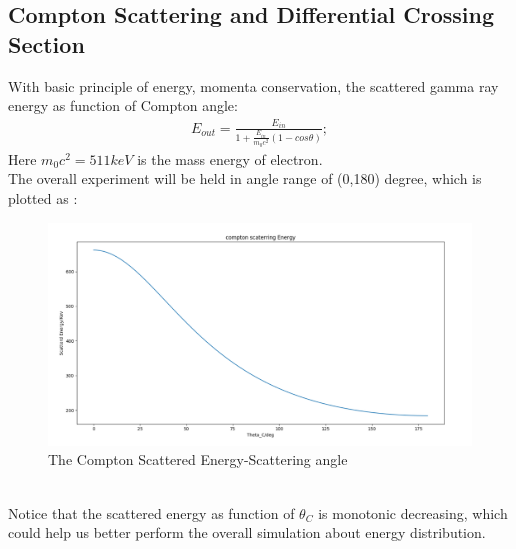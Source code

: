 \documentclass[12pt]{article}
\begin{document}
	\subsection{Compton Scattering and Differential Crossing Section}
	With basic principle of energy, momenta conservation, the scattered gamma ray energy as function of Compton angle:
	\begin{gather}
		E_{out}=\frac{E_{in}}{1+\frac{E_{in}}{{m_0c^2}}(1-cos\theta)};
	\end{gather} 
	Here $m_0c^2=511keV$ is the mass energy of electron.\\
	The overall experiment will be held in angle range of (0,180) degree, which is plotted as :
	\begin{figure}[h]
		\centering
		\includegraphics[width=0.7\linewidth]{pic/Scattered_E_simulation}
		\caption{The Compton Scattered Energy-Scattering angle}
		\label{fig:scatteredesimulation}
	\end{figure}\\
	Notice that the scattered energy as function of $\theta_C$ is monotonic decreasing, which could help us better perform the overall simulation about energy distribution.\\
	
\end{document}
